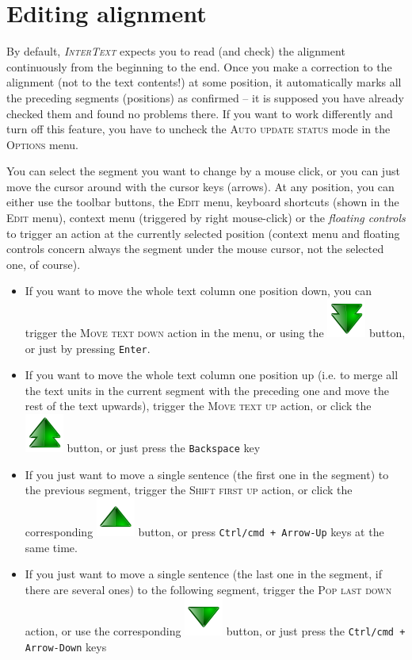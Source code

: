 \documentclass[a4paper,10pt,oneside]{book}
\newcommand{\IT}{\textit{\textsc{InterText}}\xspace}
\newcommand{\keys}[1]{\texttt{#1}}
\newcommand{\menu}[1]{\textsc{#1}}
\begin{document}
\section{Editing alignment}\label{ch:howto:edit_alignment}

By default, \IT expects you to read (and check) the alignment continuously from the beginning to the end. Once you make a correction to the alignment (not to the text contents!) at some position, it automatically marks all the preceding segments (positions) as confirmed -- it is supposed you have already checked them and found no problems there. If you want to work differently and turn off this feature, you have to uncheck the \menu{Auto update status} mode in the \menu{Options} menu.

You can select the segment you want to change by a mouse click, or you can just move the cursor around with the cursor keys (arrows). At any position, you can either use the toolbar buttons, the \menu{Edit} menu, keyboard shortcuts (shown in the \menu{Edit} menu), context menu (triggered by right mouse-click) or the \emph{floating controls} to trigger an action at the currently selected position (context menu and floating controls concern always the segment under the mouse cursor, not the selected one, of course).

\begin{itemize}
 \item If you want to move the whole text column one position down, you can trigger the \menu{Move text down} action in the menu, or using the \includegraphics[height=2ex]{../images/48/arrow-down-double.png} button, or just by pressing \keys{Enter}.
 \item If you want to move the whole text column one position up (i.e. to merge all the text units in the current segment with the preceding one and move the rest of the text upwards), trigger the \menu{Move text up} action, or click the \includegraphics[height=2ex]{../images/48/arrow-up-double.png} button, or just press the \keys{Backspace} key
 \item If you just want to move a single sentence (the first one in the segment) to the previous segment, trigger the \menu{Shift first up} action, or click the corresponding \includegraphics[height=2ex]{../images/48/arrow-up.png} button, or press \keys{Ctrl/cmd + Arrow-Up} keys at the same time.
 \item If you just want to move a single sentence (the last one in the segment, if there are several ones) to the following segment, trigger the \menu{Pop last down} action, or use the corresponding \includegraphics[height=2ex]{../images/48/arrow-down.png} button, or just press the \keys{Ctrl/cmd + Arrow-Down} keys
\end{itemize}
\end{document}
